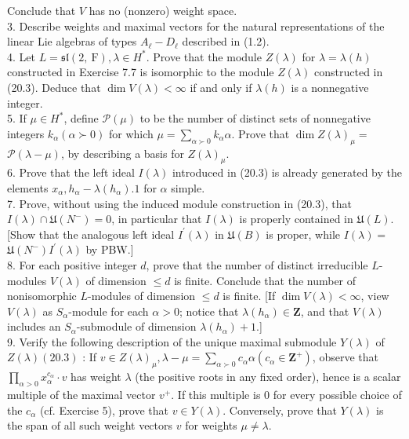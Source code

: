 \documentclass[10pt]{article}
\begin{document}
Conclude that $V$ has no (nonzero) weight space.\\
3. Describe weights and maximal vectors for the natural representations of the linear Lie algebras of types $A_{\ell}-D_{\ell}$ described in (1.2).\\
4. Let $L=\mathfrak{s l}(2, \mathrm{~F}), \lambda \in H^{*}$. Prove that the module $Z(\lambda)$ for $\lambda=\lambda(h)$ constructed in Exercise 7.7 is isomorphic to the module $Z(\lambda)$ constructed in (20.3). Deduce that $\operatorname{dim} V(\lambda)<\infty$ if and only if $\lambda(h)$ is a nonnegative integer.\\
5. If $\mu \in H^{*}$, define $\mathscr{P}(\mu)$ to be the number of distinct sets of nonnegative integers $k_{\alpha}(\alpha \succ 0)$ for which $\mu=\sum_{\alpha \succ 0} k_{\alpha} \alpha$. Prove that $\operatorname{dim} Z(\lambda)_{\mu}=$ $\mathscr{P}(\lambda-\mu)$, by describing a basis for $Z(\lambda)_{\mu}$.\\
6. Prove that the left ideal $I(\lambda)$ introduced in (20.3) is already generated by the elements $x_{\alpha}, h_{\alpha}-\lambda\left(h_{\alpha}\right) .1$ for $\alpha$ simple.\\
7. Prove, without using the induced module construction in (20.3), that $I(\lambda) \cap \mathfrak{U}\left(N^{-}\right)=0$, in particular that $I(\lambda)$ is properly contained in $\mathfrak{U}(L)$. [Show that the analogous left ideal $I^{\prime}(\lambda)$ in $\mathfrak{U}(B)$ is proper, while $I(\lambda)=$ $\mathfrak{U}\left(N^{-}\right) I^{\prime}(\lambda)$ by PBW.]\\
8. For each positive integer $d$, prove that the number of distinct irreducible $L$-modules $V(\lambda)$ of dimension $\leq d$ is finite. Conclude that the number of nonisomorphic $L$-modules of dimension $\leq d$ is finite. [If $\operatorname{dim} V(\lambda)<\infty$, view $V(\lambda)$ as $S_{\alpha}$-module for each $\alpha>0$; notice that $\lambda\left(h_{\alpha}\right) \in \mathbf{Z}$, and that $V(\lambda)$ includes an $S_{\alpha}$-submodule of dimension $\lambda\left(h_{\alpha}\right)+1$.]\\
9. Verify the following description of the unique maximal submodule $Y(\lambda)$ of $Z(\lambda)(20.3)$ : If $v \in Z(\lambda)_{\mu}, \lambda-\mu=\sum_{\alpha \succ 0} c_{\alpha} \alpha\left(c_{\alpha} \in \mathbf{Z}^{+}\right)$, observe that $\prod_{\alpha>0} x_{\alpha}^{c_{\alpha}} \cdot v$ has weight $\lambda$ (the positive roots in any fixed order), hence is a scalar multiple of the maximal vector $v^{+}$. If this multiple is 0 for every possible choice of the $c_{\alpha}$ (cf. Exercise 5), prove that $v \in Y(\lambda)$. Conversely, prove that $Y(\lambda)$ is the span of all such weight vectors $v$ for weights $\mu \neq \lambda$.\\
\end{document}
